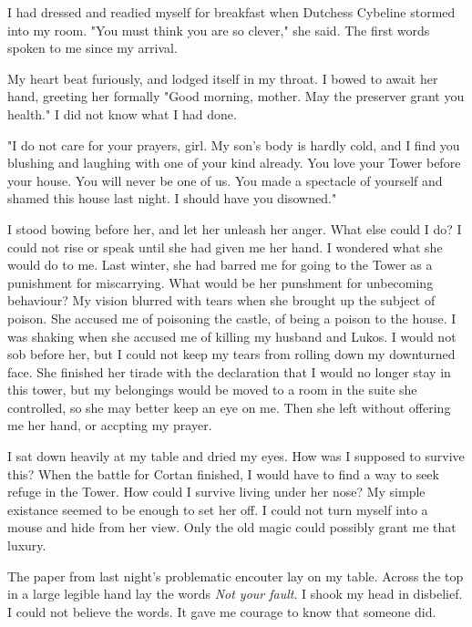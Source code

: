 \documentclass{article}
\begin{document}
I had dressed and readied myself for breakfast when Dutchess Cybeline stormed into my room. "You must think you are so clever," she said. The first words spoken to me since my arrival.

My heart beat furiously, and lodged itself in my throat. I bowed to await her hand, greeting her formally "Good morning, mother. May the preserver grant you health." I did not know what I had done.

"I do not care for your prayers, girl. My son's body is hardly cold, and I find you blushing and laughing with one of your kind already. You love your Tower before your house. You will never be one of us. You made a spectacle of yourself and shamed this house last night. I should have you disowned." 

I stood bowing before her, and let her unleash her anger. What else could I do? I could not rise or speak until she had given me her hand. I wondered what she would do to me. Last winter, she had barred me for going to the Tower as a punishment for miscarrying. What would be her punshment for unbecoming behaviour? My vision blurred with tears when she brought up the subject of poison. She accused me of poisoning the castle, of being a poison to the house. I was shaking when she accused me of killing my husband and Lukos. I would not sob before her, but I could not keep my tears from rolling down my downturned face. She finished her tirade with the declaration that I would no longer stay in this tower, but my belongings would be moved to a room in the suite she controlled, so she may better keep an eye on me. Then she left without offering me her hand, or accpting my prayer.

I sat down heavily at my table and dried my eyes. How was I supposed to survive this? When the battle for Cortan finished, I would have to find a way to seek refuge in the Tower. How could I survive living under her nose? My simple existance seemed to be enough to set her off. I could not turn myself into a mouse and hide from her view. Only the old magic could possibly grant me that luxury.

The paper from last night's problematic encouter lay on my table. Across the top in a large legible hand lay the words \emph{Not your fault}. I shook my head in disbelief. I could not believe the words. It gave me courage to know that someone did. 
\end{document}
